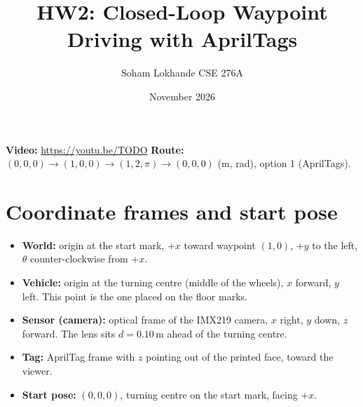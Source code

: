 \documentclass[10pt]{article}
\title{\vspace{-1.5em}HW2: Closed-Loop Waypoint Driving with AprilTags}
\author{Soham Lokhande \quad CSE 276A}
\date{November 2026}
\begin{document}
\maketitle
\vspace{-1.5em}

\textbf{Video:} \url{https://youtu.be/TODO} \qquad
\textbf{Route:} $(0,0,0)\to(1,0,0)\to(1,2,\pi)\to(0,0,0)$ (m, rad), option 1 (AprilTags).

\section*{Coordinate frames and start pose}
\begin{itemize}
  \item \textbf{World:} origin at the start mark, $+x$ toward waypoint $(1,0)$, $+y$ to the left, $\theta$ counter-clockwise from $+x$.
  \item \textbf{Vehicle:} origin at the turning centre (middle of the wheels), $x$ forward, $y$ left. This point is the one placed on the floor marks.
  \item \textbf{Sensor (camera):} optical frame of the IMX219 camera, $x$ right, $y$ down, $z$ forward. The lens sits $d = 0.10$\,m ahead of the turning centre.
  \item \textbf{Tag:} AprilTag frame with $z$ pointing out of the printed face, toward the viewer.
  \item \textbf{Start pose:} $(0, 0, 0)$, turning centre on the start mark, facing $+x$.
\end{itemize}
\end{document}
